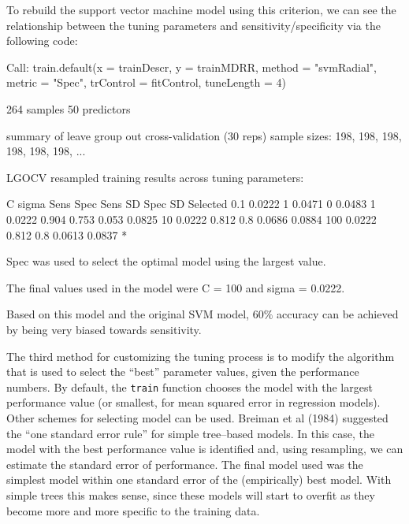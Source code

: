 \documentclass[12pt]{article}
\begin{document}
To rebuild the support vector machine model using this criterion, we can see the relationship between the tuning parameters and sensitivity/specificity via the following code:
\begin{Schunk}
\begin{Soutput}
Call:
train.default(x = trainDescr, y = trainMDRR, method = "svmRadial", 
    metric = "Spec", trControl = fitControl, tuneLength = 4)

264 samples
50 predictors

summary of leave group out cross-validation (30 reps) sample sizes:
    198, 198, 198, 198, 198, 198, ... 

LGOCV resampled training results across tuning parameters:

  C    sigma   Sens   Spec    Sens SD  Spec SD  Selected
  0.1  0.0222  1      0.0471  0        0.0483           
  1    0.0222  0.904  0.753   0.053    0.0825           
  10   0.0222  0.812  0.8     0.0686   0.0884           
  100  0.0222  0.812  0.8     0.0613   0.0837   *       

Spec was used to select the optimal model using the largest value.

The final values used in the model were C = 100 and sigma = 0.0222.
\end{Soutput}
\end{Schunk}
Based on this model and the original SVM model, 60$\%$ accuracy can be achieved  by being very biased towards sensitivity.

The third method for customizing the tuning process is to modify the algorithm that is used to select the ``best'' parameter values, given the performance numbers. By default, the \texttt{train} function chooses the model with the largest performance value (or smallest, for mean squared error in regression models). Other schemes for selecting model can be used.  Breiman et al (1984) suggested the ``one standard error rule'' for simple tree--based models. In this case, the model with the best performance value is identified and, using resampling, we can estimate the standard error of performance. The final model used was the simplest model within one standard error of the (empirically) best model. With simple trees this makes sense, since these models will start to overfit as they become more and more specific to the training data.
\end{document}
